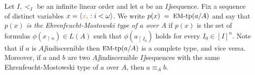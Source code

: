 \documentclass[creche.tex]{subfiles}
\begin{document}
Let $I,<_I$ be an infinite linear order and let $a$ be an $I\jj$sequence. Fix a sequence of distinct variables $x=\langle{\color{brown}x_i}: i<\omega\rangle$. We write \emph{$p(x)\;=\;\textrm{{\small EM}-tp}(a/A)$} and say that  \emph{$p(x)$ is the Ehren\-feucht-Mostowski type of $a$ over $A$\/} if $p(x)$ is the set of formulas $\phi(x_{\restriction n})\in L(A)$ such that $\phi(a_{\restriction I_0})$ holds for every $I_0\in[I]^{n}$. Note that if $a$ is $A\jj$indiscernible then $\textrm{{\small EM}\mbox{-}tp}(a/A)$ is a complete type, and vice versa. Moreover, if $a$ and $b$ are two $A\jj$indiscernible $I\jj$sequences with the same Ehren\-feucht-Mostowski type of $a$ over $A$, then $a\equiv_A b$.
 
% 
% 
% 
% 
% 
% 
% 
% 
\end{document}
